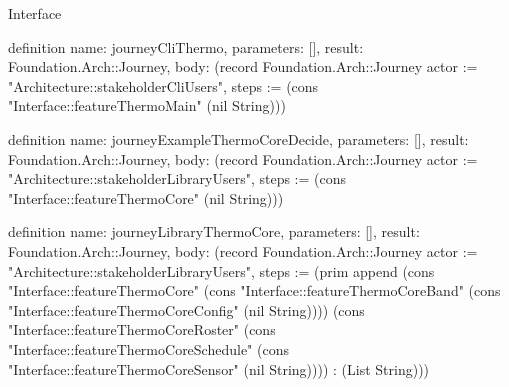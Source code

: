 \begin{lexlean}{Interface}
\begin{semanticmodule}
definition{
  name: journeyCliThermo,
  parameters: [],
  result: Foundation.Arch::Journey,
  body: (record Foundation.Arch::Journey {actor := "Architecture::stakeholderCliUsers", steps := (cons "Interface::featureThermoMain" (nil String))})
}

definition{
  name: journeyExampleThermoCoreDecide,
  parameters: [],
  result: Foundation.Arch::Journey,
  body: (record Foundation.Arch::Journey {actor := "Architecture::stakeholderLibraryUsers", steps := (cons "Interface::featureThermoCore" (nil String))})
}

definition{
  name: journeyLibraryThermoCore,
  parameters: [],
  result: Foundation.Arch::Journey,
  body: (record Foundation.Arch::Journey {actor := "Architecture::stakeholderLibraryUsers", steps := (prim append (cons "Interface::featureThermoCore" (cons "Interface::featureThermoCoreBand" (cons "Interface::featureThermoCoreConfig" (nil String)))) (cons "Interface::featureThermoCoreRoster" (cons "Interface::featureThermoCoreSchedule" (cons "Interface::featureThermoCoreSensor" (nil String)))) : (List String))})
}
\end{semanticmodule}
\end{lexlean}
